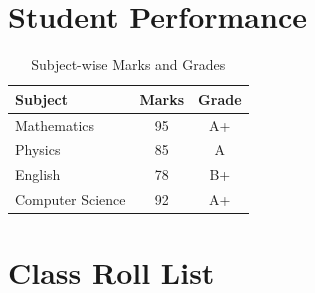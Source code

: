 \documentclass{article}
\begin{document}
		\section{Student Performance}
		
		\begin{table}[h]
			\centering
			
			\caption{Subject-wise Marks and Grades}
			\label{tab:marks}
			
			\begin{tabular}{lcc}
				\toprule
				
				\rowcolor{blue!20}
				Subject & Marks & Grade \\
				
				\midrule
				
				Mathematics & 95 & A+ \\
				
				\rowcolor{gray!15}
				Physics & 85 & A \\
				
				English & 78 & B+ \\
				
				\rowcolor{gray!15}
				Computer Science & 92 & A+ \\
				
				\bottomrule
			\end{tabular}
			
		\end{table}
		\section{Class Roll List}
		
\end{document}
